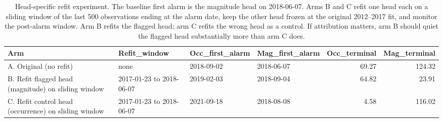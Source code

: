 \begin{table}

\caption{Head-specific refit experiment. The baseline first alarm is the magnitude head on 2018-06-07. Arms B and C refit one head each on a sliding window of the last 500 observations ending at the alarm date, keep the other head frozen at the original 2012--2017 fit, and monitor the post-alarm window. Arm B refits the flagged head; arm C refits the wrong head as a control. If attribution matters, arm B should quiet the flagged head substantially more than arm C does.}
\centering
\begin{tabular}[t]{llllrr}
\toprule
Arm & Refit\_window & Occ\_first\_alarm & Mag\_first\_alarm & Occ\_terminal & Mag\_terminal\\
\midrule
A. Original (no refit) & none & 2018-09-02 & 2018-06-07 & 69.27 & 124.32\\
B. Refit flagged head (magnitude) on sliding window & 2017-01-23 to 2018-06-07 & 2019-02-03 & 2018-09-04 & 64.82 & 23.91\\
C. Refit control head (occurrence) on sliding window & 2017-01-23 to 2018-06-07 & 2021-09-18 & 2018-08-08 & 4.58 & 116.02\\
\bottomrule
\end{tabular}
\end{table}
